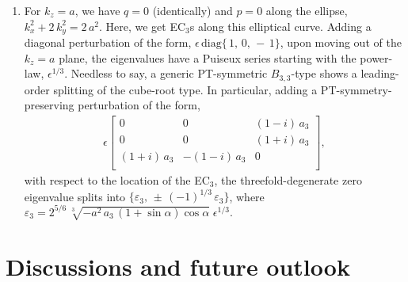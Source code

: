 \documentclass[aps, prb, onecolumn, nofootinbib, citeautoscript, 10pt]{revtex4-2}
\begin{document}
\begin{enumerate}
\item For $k_z= a $, we have $q=0$ (identically) and $ p = 0 $ along the ellipse, $k_x^2 + 2\, k_y^2 = 2\, a^2$. Here, we get EC$_3$s along this elliptical curve. Adding a diagonal perturbation of the form, $\epsilon \,\text{diag} \lbrace \,1,\,0,\, -\,1 \rbrace $, upon moving out of the $k_z = a$ plane, the eigenvalues have a Puiseux series starting with the power-law, $ \epsilon^{1/3}$. Needless to say, a generic PT-symmetric $B_{3,3}$-type shows a leading-order splitting of the cube-root type. In particular, adding a PT-symmetry-preserving perturbation of the form,
 \begin{align}
\epsilon \begin{bmatrix}
 0 & 0 & (1-i)\, a_3 \\
 0 & 0 & (1+i)\, a_3 \\
 (1+i)\, a_3 & -(1-i)\,a_3 & 0 \\
 \end{bmatrix},
 \end{align}
with respect to the location of the EC$_3$, the threefold-degenerate zero eigenvalue splits into $\lbrace  \varepsilon_3  ,\,
\pm \,(-1)^{1/3}\,  \varepsilon_3   \rbrace $, where $ \varepsilon_3 =  2^{5/6}\, \sqrt[3]{-a^2\, a_3\, ( 1 + \sin \alpha ) \cos \alpha }
 \;\epsilon^{1/3}$.
 
\end{enumerate}


\section{Discussions and future outlook}
\label{secsum}
\end{document}
